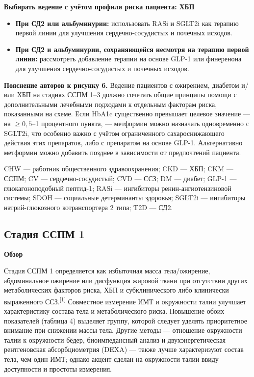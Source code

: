 \documentclass[11pt,a4paper]{article}
\newcommand{\src}[1]{\textsuperscript{[#1]}}
\newcommand{\heading}[1]{\par\medskip\textbf{#1}\par}
\begin{document}
\heading{Выбирать ведение с учётом профиля риска пациента: ХБП}
\begin{itemize}
\item \textbf{При СД2 или альбуминурии:} использовать RASi и SGLT2i как терапию первой линии для улучшения сердечно-сосудистых и почечных исходов.
\item \textbf{При СД2 и альбуминурии, сохраняющейся несмотря на терапию первой линии:} рассмотреть добавление терапии на основе GLP-1 или финеренона для улучшения сердечно-сосудистых и почечных исходов.
\end{itemize}

\textbf{Пояснение авторов к рисунку 6.} Ведение пациентов с ожирением, диабетом и/или ХБП на стадиях ССПМ 1--3 должно сочетать общие принципы помощи с дополнительными лечебными подходами к отдельным факторам риска, показанными на схеме. Если HbA1c существенно превышает целевое значение --- на $\geq0{,}5$--1 процентного пункта, --- метформин можно назначать одновременно с SGLT2i, что особенно важно с учётом ограниченного сахароснижающего действия этих препаратов, либо с препаратом на основе GLP-1. Альтернативно метформин можно добавить позднее в зависимости от предпочтений пациента.

CHW --- работник общественного здравоохранения; CKD --- ХБП; CKM --- ССПМ; CV --- сердечно-сосудистый; CVD --- ССЗ; DM --- диабет; GLP-1 --- глюкагоноподобный пептид-1; RASi --- ингибиторы ренин-ангиотензиновой системы; SDOH --- социальные детерминанты здоровья; SGLT2i --- ингибиторы натрий-глюкозного котранспортера 2 типа; T2D --- СД2.


\subsection{Стадия ССПМ 1}
\heading{Обзор}
Стадия ССПМ 1 определяется как избыточная масса тела/ожирение, абдоминальное ожирение или дисфункция жировой ткани при отсутствии других метаболических факторов риска, ХБП и субклинического либо клинически выраженного ССЗ.\src{1} Совместное измерение ИМТ и окружности талии улучшает характеристику состава тела и метаболического риска. Повышение обоих показателей (таблица 4) выделяет группу, которой следует уделять приоритетное внимание при снижении массы тела. Другие методы --- отношение окружности талии к окружности бёдер, биоимпедансный анализ и двухэнергетическая рентгеновская абсорбциометрия (DEXA) --- также лучше характеризуют состав тела, чем один ИМТ; однако акцент сделан на окружности талии ввиду доступности и простоты измерения.
\end{document}

